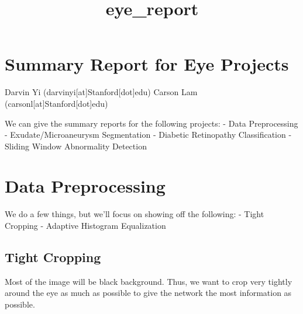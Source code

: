 \documentclass[11pt]{article}
\title{eye\_report}
\begin{document}
    
    
    \maketitle
    
    

    
    \section{Summary Report for Eye
Projects}\label{summary-report-for-eye-projects}

Darvin Yi (darvinyi{[}at{]}Stanford{[}dot{]}edu) Carson Lam
(carsonl{[}at{]}Stanford{[}dot{]}edu)

We can give the summary reports for the following projects: - Data
Preprocessing - Exudate/Microaneurysm Segmentation - Diabetic
Retinopathy Classification - Sliding Window Abnormality Detection

    \section{Data Preprocessing}\label{data-preprocessing}

We do a few things, but we'll focus on showing off the following: -
Tight Cropping - Adaptive Histogram Equalization

    \subsection{Tight Cropping}\label{tight-cropping}

Most of the image will be black background. Thus, we want to crop very
tightly around the eye as much as possible to give the network the most
information as possible.
\end{document}
